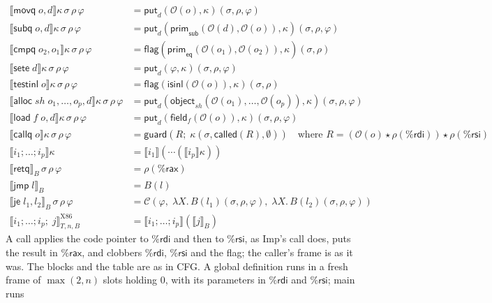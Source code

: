 \documentclass[10pt]{article}
\theoremstyle{acmplain}
\newcommand{\SEM}[1]{\llbracket #1 \rrbracket}
\newcommand{\key}[1]{\mathsf{#1}}
\newcommand{\app}{\star}
\newcommand{\rax}{\%\key{rax}}
\newcommand{\rdi}{\%\key{rdi}}
\newcommand{\rsi}{\%\key{rsi}}
\begin{document}
\begin{align*}
  \SEM{\key{movq}\; o, d}\kappa\,\sigma\,\rho\,\varphi &= \key{put}_d(\mathcal{O}(o), \kappa)(\sigma, \rho, \varphi) \\
  \SEM{\key{subq}\; o, d}\kappa\,\sigma\,\rho\,\varphi &=
    \key{put}_d(\key{prim}_{\key{sub}}(\mathcal{O}(d), \mathcal{O}(o)), \kappa)(\sigma, \rho, \varphi) \\
  \SEM{\key{cmpq}\; o_2, o_1}\kappa\,\sigma\,\rho\,\varphi &=
    \key{flag}(\key{prim}_{\key{eq}}(\mathcal{O}(o_1), \mathcal{O}(o_2)), \kappa)(\sigma, \rho) \\
  \SEM{\key{sete}\; d}\kappa\,\sigma\,\rho\,\varphi &= \key{put}_d(\varphi, \kappa)(\sigma, \rho, \varphi) \\
  \SEM{\key{testinl}\; o}\kappa\,\sigma\,\rho\,\varphi &=
    \key{flag}(\key{isinl}(\mathcal{O}(o)), \kappa)(\sigma, \rho) \\
  \SEM{\key{alloc}\; \mathit{sh}\; o_1, \ldots, o_p, d}\kappa\,\sigma\,\rho\,\varphi &=
    \key{put}_d(\key{object}_{\mathit{sh}}(\mathcal{O}(o_1), \ldots, \mathcal{O}(o_p)), \kappa)(\sigma, \rho, \varphi) \\
  \SEM{\key{load}\; f\; o, d}\kappa\,\sigma\,\rho\,\varphi &=
    \key{put}_d(\key{field}_f(\mathcal{O}(o)), \kappa)(\sigma, \rho, \varphi) \\
  \SEM{\key{callq}\; o}\kappa\,\sigma\,\rho\,\varphi &= \key{guard}(R;\; \kappa(\sigma, \key{called}(R), \emptyset))
    \quad\text{where } R = (\mathcal{O}(o) \app \rho(\rdi)) \app \rho(\rsi) \\[1ex]
  \SEM{i_1; \ldots; i_p}\kappa &= \SEM{i_1}(\cdots(\SEM{i_p}\kappa)) \\
  \SEM{\key{retq}}_B\,\sigma\,\rho\,\varphi &= \rho(\rax) \\
  \SEM{\key{jmp}\; l}_B &= B(l) \\
  \SEM{\key{je}\; l_1, l_2}_B\,\sigma\,\rho\,\varphi &=
    \mathcal{C}(\varphi,\; \lambda X.\, B(l_1)(\sigma, \rho, \varphi),\; \lambda X.\, B(l_2)(\sigma, \rho, \varphi)) \\
  \SEM{i_1; \ldots; i_p;\; j}^{\mathrm{X86}}_{T,n,B} &= \SEM{i_1; \ldots; i_p}(\SEM{j}_B)
\end{align*}
A call applies the code pointer to $\rdi$ and then to $\rsi$, as Imp's
call does, puts the result in $\rax$, and clobbers $\rdi$, $\rsi$ and
the flag; the caller's frame is as it was. The blocks and the table are
as in CFG. A global definition runs in a fresh frame of $\max(2, n)$
slots holding $0$, with its parameters in $\rdi$ and $\rsi$; main runs
\end{document}
